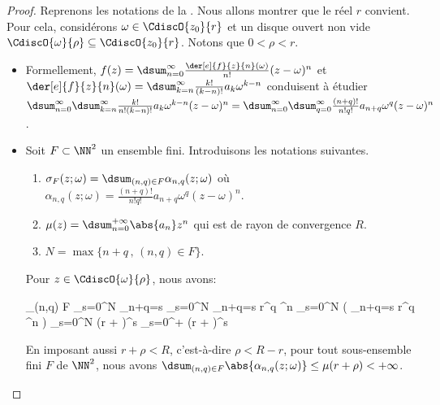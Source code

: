 \begin{proof}
    Reprenons les notations de la .
    Nous allons montrer que le réel $r$ convient.
    Pour cela, considérons $\omega \in \CdiscO{z_0}{r}$
    et
    un disque ouvert non vide $\CdiscO{\omega}{\rho} \subseteq \CdiscO{z_0}{r}$.
    Notons que $0 < \rho < r$.
	\begin{itemize}
		\item Formellement,
		$f(z) = \dsum_{n = 0}^{\infty} \frac{\der[e]{f}{z}{n}(\omega)}{n!} (z - \omega)^n$
		et
		$\der[e]{f}{z}{n}(\omega) = \dsum_{k = n}^{\infty} \frac{k!}{(k-n)!} a_k \omega^{k - n}$
		conduisent à étudier
		$ \dsum_{n = 0}^{\infty} \dsum_{k = n}^{\infty} \frac{k!}{n! (k-n)!} a_k \omega^{k - n} (z - \omega)^n
		= \dsum_{n = 0}^{\infty} \dsum_{q = 0}^{\infty} \frac{(n+q)!}{n! q!} a_{n+q} \omega^q (z - \omega)^n$.
	

		\item Soit $F \subset \NN^2$ un ensemble fini.
		Introduisons les notations suivantes.
		\begin{enumerate}
			\item $\sigma_F(z ; \omega) = \dsum_{(n,q) \in F} \alpha_{n,q}(z ; \omega)$
			où
			$\alpha_{n,q}(z ; \omega) = \frac{(n+q)!}{n! q!} a_{n+q} \omega^q (z - \omega)^n$.

			\item $\mu(z) = \dsum_{n = 0}^{+\infty} \abs{a_n} z^n$ qui est de rayon de convergence $R$.

			\item $N = \max \big\{ n + q \,,\, (n,q) \in F \big\}$.
		\end{enumerate}
		
		\noindent
		Pour $z \in \CdiscO{\omega}{\rho}$, nous avons:
		
		\noindent\kern-6pt
		\begin{stepcalc}[style=sar, ope=\leq]
			\dsum_{(n,q) \in F} 
		\explnext{}
			\dsum_{s=0}^{N} \dsum_{n+q=s} 
		\explnext{}
			\dsum_{s=0}^{N} \dsum_{n+q=s}   r^q \rho^n
		\explnext{}
			\dsum_{s=0}^{N}  \big( \dsum_{n+q=s}  r^q \rho^n \big)
		\explnext{}
			\dsum_{s=0}^{N}  (r + \rho)^s
		\explnext{}
			\dsum_{s=0}^{+\infty}  (r + \rho)^s
		\end{stepcalc}
		
		\noindent
		En imposant aussi $r + \rho < R$, c'est-à-dire $\rho < R - r$, 
		pour tout sous-ensemble fini $F$ de $\NN^2$, nous avons
		$\dsum_{(n,q) \in F} \abs{\alpha_{n,q}(z ; \omega)} \leq \mu(r + \rho) < +\infty$.
		

\end{itemize}
\end{proof}

